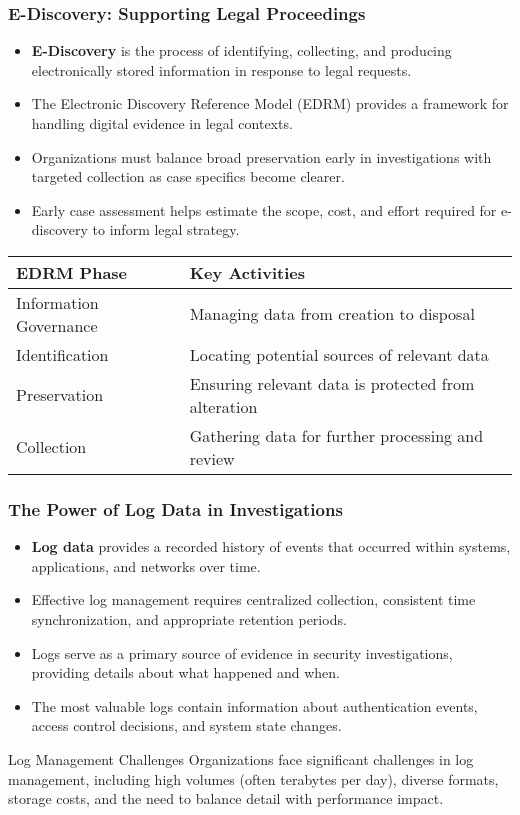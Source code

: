 \documentclass{beamer}
\begin{document}
\begin{frame}
\frametitle{E-Discovery: Supporting Legal Proceedings}
\begin{itemize}
\item \textbf{E-Discovery} is the process of identifying, collecting, and producing electronically stored information in response to legal requests.
\item The Electronic Discovery Reference Model (EDRM) provides a framework for handling digital evidence in legal contexts.
\item Organizations must balance broad preservation early in investigations with targeted collection as case specifics become clearer.
\item Early case assessment helps estimate the scope, cost, and effort required for e-discovery to inform legal strategy.
\end{itemize}

\begin{center}
\scriptsize
\begin{tabular}{|l|p{5cm}|}
\hline
\textbf{EDRM Phase} & \textbf{Key Activities} \\
\hline
Information Governance & Managing data from creation to disposal \\
Identification & Locating potential sources of relevant data \\
Preservation & Ensuring relevant data is protected from alteration \\
Collection & Gathering data for further processing and review \\
\hline
\end{tabular}
\end{center}
\end{frame}


\begin{frame}
\frametitle{The Power of Log Data in Investigations}
\begin{itemize}
\item \textbf{Log data} provides a recorded history of events that occurred within systems, applications, and networks over time.
\item Effective log management requires centralized collection, consistent time synchronization, and appropriate retention periods.
\item Logs serve as a primary source of evidence in security investigations, providing details about what happened and when.
\item The most valuable logs contain information about authentication events, access control decisions, and system state changes.
\end{itemize}

\begin{alertblock}{Log Management Challenges}
\scriptsize
Organizations face significant challenges in log management, including high volumes (often terabytes per day), diverse formats, storage costs, and the need to balance detail with performance impact.
\end{alertblock}
\end{frame}
\end{document}
